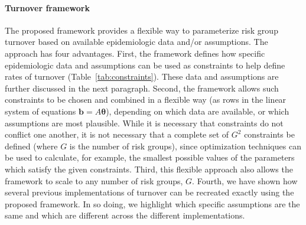 \paragraph{Turnover framework}
The proposed framework provides a flexible way to parameterize risk group turnover
based on available epidemiologic data and/or assumptions.
The approach has four advantages.
First, the framework defines how specific epidemiologic data and assumptions
can be used as constraints to help define rates of turnover
(Table~\ref{tab:constraints}).
These data and assumptions are further discussed in the next paragraph.
Second, the framework allows such constraints to be chosen and combined in a flexible way
(as rows in the linear system of equations $\bm{b} = A\bm{\theta}$),
depending on which data are available, or which assumptions are most plausible.
While it is necessary that constraints do not conflict one another,
it is not necessary that a complete set of $G^2$ constraints be defined
(where $G$ is the number of risk groups),
since optimization techniques can be used to calculate, for example,
the smallest possible values of the parameters which satisfy the given constraints.
Third, this flexible approach also allows the framework to scale
to any number of risk groups, $G$.
Fourth, we have shown how several previous implementations of turnover
\citep{Stigum1994,Eaton2014,Henry2015}
can be recreated exactly using the proposed framework.
In so doing, we highlight which specific assumptions are
the same and which are different
across the different implementations.
